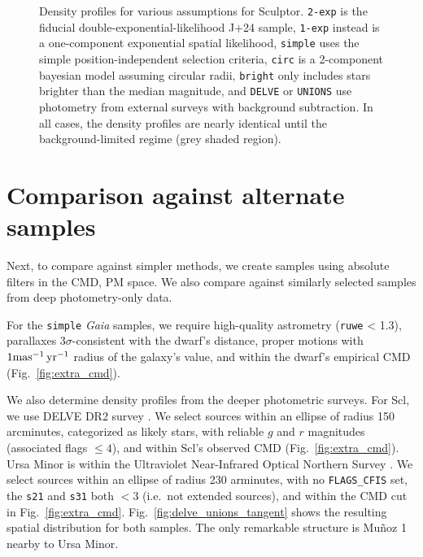 \begin{figure}
\centering
{}
\caption[Sculptor density methodology comparison]{Density profiles for
various assumptions for Sculptor. \texttt{2-exp} is the fiducial
double-exponential-likelihood J+24 sample, \texttt{1-exp} instead is a
one-component exponential spatial likelihood, \texttt{simple} uses the
simple position-independent selection criteria, \texttt{circ} is a
2-component bayesian model assuming circular radii, \texttt{bright} only
includes stars brighter than the median magnitude, and \texttt{DELVE} or
\texttt{UNIONS} use photometry from external surveys with background
subtraction. In all cases, the density profiles are nearly identical
until the background-limited regime (grey shaded
region).}\label{fig:scl_umi_density_extras}
\end{figure}

\section{Comparison against alternate
samples}\label{sec:simple_selection}

Next, to compare against simpler methods, we create samples using
absolute filters in the CMD, PM space. We also compare against similarly
selected samples from deep photometry-only data.

For the \texttt{simple} \emph{Gaia} samples, we require high-quality
astrometry (\texttt{ruwe} \textless{} 1.3), parallaxes
\(3\sigma\)-consistent with the dwarf's distance, proper motions with
\(1{\rm mas^{-1}\,yr^{-1}}\) radius of the galaxy's value, and within the dwarf's
empirical CMD (Fig.~\ref{fig:extra_cmd}).

We also determine density profiles from the deeper photometric surveys.
For Scl, we use DELVE DR2 survey \citep{drlica-wagner+2022}. We select
sources within an ellipse of radius 150 arcminutes, categorized as
likely stars, with reliable \(g\) and \(r\) magnitudes (associated flags
\(\leq 4\)), and within Scl's observed CMD (Fig.~\ref{fig:extra_cmd}).
Ursa Minor is within the Ultraviolet Near-Infrared Optical Northern
Survey \citep[UNIONS,][]{gwyn+2025}. We select sources within an ellipse
of radius 230 arminutes, with no \texttt{FLAGS\_CFIS} set, the
\texttt{s21} and \texttt{s31} both \(<3\) (i.e.~not extended sources),
and within the CMD cut in Fig.~\ref{fig:extra_cmd}.
Fig.~\ref{fig:delve_unions_tangent} shows the resulting spatial
distribution for both samples. The only remarkable structure is Muñoz 1
nearby to Ursa Minor.

